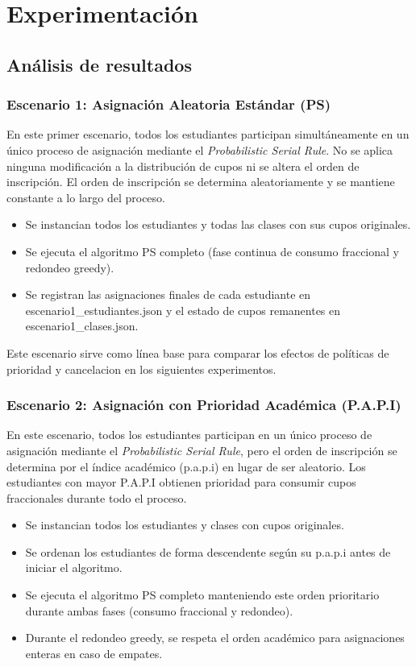 \documentclass{article}
\begin{document}
\section{Experimentación}\label{sec:exp}

\subsection{Análisis de resultados}

\subsubsection{Escenario 1: Asignación Aleatoria Estándar (PS)}
En este primer escenario, todos los estudiantes participan simultáneamente en un único
 proceso de asignación mediante el \emph{Probabilistic Serial Rule}. No se aplica 
 ninguna modificación a la distribución de cupos ni se altera el orden de inscripción.
 El orden de inscripción se determina aleatoriamente y se mantiene constante a lo largo
  del proceso.

\begin{itemize}
\item Se instancian todos los estudiantes y todas las clases con sus cupos originales.
\item Se ejecuta el algoritmo PS completo (fase continua de consumo fraccional y 
redondeo greedy).
\item Se registran las asignaciones finales de cada estudiante en escenario1\_estudiantes.json y 
 el estado de cupos remanentes en escenario1\_clases.json.
\end{itemize}

Este escenario sirve como línea base para comparar los efectos de políticas de prioridad
 y cancelacion en los siguientes experimentos.

 \subsubsection{Escenario 2: Asignación con Prioridad Académica (P.A.P.I)}
 En este escenario, todos los estudiantes participan en un único proceso de asignación mediante el
  \emph{Probabilistic Serial Rule}, pero el orden de inscripción se determina por el índice académico 
  (p.a.p.i) en lugar de ser aleatorio. Los estudiantes con mayor P.A.P.I obtienen prioridad para 
  consumir cupos fraccionales durante todo el proceso.
 
 \begin{itemize}
 \item Se instancian todos los estudiantes y clases con cupos originales.
 \item Se ordenan los estudiantes de forma descendente según su p.a.p.i antes de iniciar el algoritmo.
 \item Se ejecuta el algoritmo PS completo manteniendo este orden prioritario durante ambas fases (consumo fraccional y redondeo).
 \item Durante el redondeo greedy, se respeta el orden académico para asignaciones enteras en caso de empates.
 \end{itemize}
 
\end{document}
